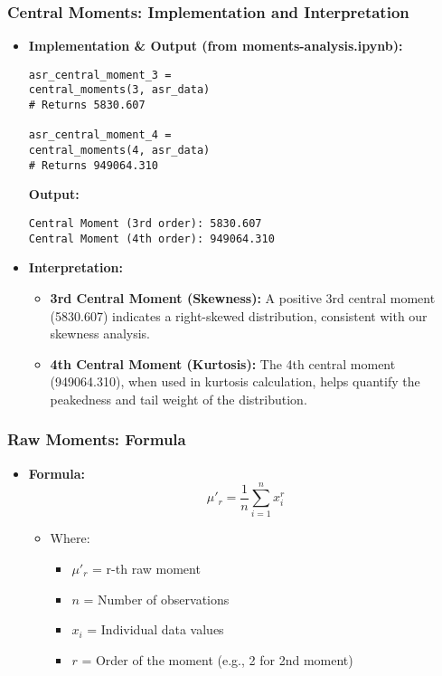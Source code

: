 \begin{frame}[fragile]
    \frametitle{Central Moments: Implementation and Interpretation}
    \begin{itemize}
        \item \textbf{Implementation \& Output (from moments-analysis.ipynb):}
              \begin{lstlisting}
asr_central_moment_3 =
central_moments(3, asr_data)
# Returns 5830.607

asr_central_moment_4 =
central_moments(4, asr_data)
# Returns 949064.310
        \end{lstlisting}
              \textbf{Output:}
              \begin{verbatim}
Central Moment (3rd order): 5830.607
Central Moment (4th order): 949064.310
        \end{verbatim}

        \item \textbf{Interpretation:}
              \begin{itemize}
                  \item \textbf{3rd Central Moment (Skewness):} A positive 3rd central moment (5830.607) indicates a right-skewed distribution, consistent with our skewness analysis.
                  \item \textbf{4th Central Moment (Kurtosis):} The 4th central moment (949064.310), when used in kurtosis calculation, helps quantify the peakedness and tail weight of the distribution.
              \end{itemize}
    \end{itemize}
\end{frame}

\begin{frame}[fragile]
    \frametitle{Raw Moments: Formula}
    \begin{itemize}
        \item \textbf{Formula:}
              \[
                  \mu'_r = \frac{1}{n} \sum_{i=1}^{n} x_i^r
              \]
              \begin{itemize}
                  \item Where:
                        \begin{itemize}
                            \item $\mu'_r$ = r-th raw moment
                            \item $n$ = Number of observations
                            \item $x_i$ = Individual data values
                            \item $r$ = Order of the moment (e.g., 2 for 2nd moment)
                        \end{itemize}
              \end{itemize}
    \end{itemize}
\end{frame}

